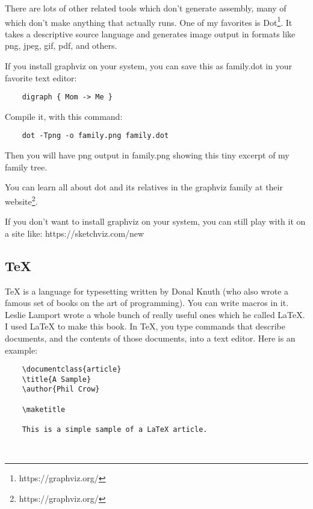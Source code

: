 There are lots of other related tools which don't generate assembly,
many of which don't make anything that actually runs. One of my favorites
is Dot\footnote{https://graphviz.org/}. It takes a descriptive source
language and generates image output in formats like png, jpeg, gif,
pdf, and others.

If you install graphviz on your system, you can save this as family.dot
in your favorite text editor:

{\footnotesize
\begin{verbatim}
    digraph { Mom -> Me }
\end{verbatim}
}

Compile it, with this command:

{\footnotesize
\begin{verbatim}
    dot -Tpng -o family.png family.dot
\end{verbatim}
}

Then you will have png output in family.png showing this tiny excerpt
of my family tree.

You can learn all about dot and its relatives in the graphviz family
at their website\footnote{https://graphviz.org/}.

If you don't want to install graphviz on your system, you can
still play with it on a site like: https://sketchviz.com/new

\subsection{TeX}

TeX is a language for typesetting written by Donal Knuth (who also
wrote a famous set of books on the art of programming). You can write
macros in it. Leslie Lamport wrote a whole bunch of really useful ones
which he called LaTeX. I used LaTeX to make this book. In TeX,
you type commands that describe documents, and the contents of those
documents, into a text editor. Here is an example:

{\footnotesize
\begin{verbatim}
    \documentclass{article}
    \title{A Sample}
    \author{Phil Crow}
    
    \maketitle

    This is a simple sample of a LaTeX article.

    
\end{verbatim}
}

